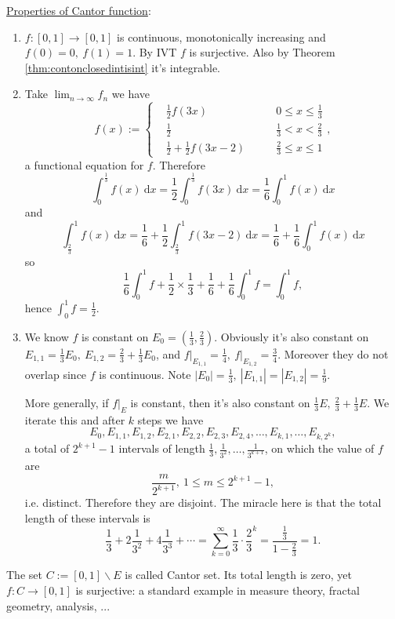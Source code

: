 \documentclass[a4paper]{article}
\theoremstyle{definition}
\begin{document}
\underline{Properties of Cantor function}:
\begin{enumerate}
    \item $f:[0,1]\rightarrow [0,1]$ is continuous, monotonically increasing and $f(0)=0,\ f(1)=1$. By IVT $f$ is surjective. Also by Theorem \ref{thm:contonclosedintisint} it's integrable.
    \item Take $\lim_{n\rightarrow \infty} f_n$ we have
    \[
    f(x) := \left\{\begin{aligned}&\frac12 f (3x) \qquad &0\leq x \leq \frac13 \\ &\frac12 \qquad &\frac13 <x < \frac23 \\ &\frac12 + \frac12 f(3x-2) \qquad &\frac23 \leq x \leq 1\end{aligned} \right. ,
    \]
    a functional equation for $f$. Therefore
    \[
    \int_0^\frac13 f(x) \ \mathrm d x = \frac12 \int_0^\frac13 f(3x) \ \mathrm d x = \frac16 \int_0^1 f(x) \ \mathrm d x
    \]
    and
    \[
    \int_\frac23^1 f(x) \ \mathrm d x = \frac16 + \frac12 \int_\frac23^1 f(3x-2) \ \mathrm d x = \frac16 +\frac16 \int_0^1 f(x) \ \mathrm d x
    \]
    so
    \[
    \frac16 \int_0^1 f + \frac12 \times \frac13+\frac16+\frac16\int_0^1 f=\int_0^1 f,
    \]
    hence $\int_0^1 f = \frac12$.
    \item We know $f$ is constant on $E_0=\left(\frac13,\frac23 \right).$ Obviously it's also constant on $E_{1,1}=\frac13 E_0,\ E_{1,2}=\frac23+\frac13 E_0$, and $\left.f\right|_{E_{1,1}}=\frac14,\ \left.f\right|_{E_{1,2}}=\frac34$. Moreover they do not overlap since $f$ is continuous. Note $|E_0|=\frac13,\ |E_{1,1}|=|E_{1,2}|=\frac19$.
    
    More generally, if $\left.f\right|_E$ is constant, then it's also constant on $\frac13 E,\ \frac23+\frac13 E$. We iterate this and after $k$ steps we have 
    \[
    E_0,E_{1,1},E_{1,2},E_{2,1},E_{2,2},E_{2,3},E_{2,4},\ldots,E_{k,1},\ldots,E_{k,2^k},
    \]
    a total of $2^{k+1}-1$ intervals of length $\frac13,\frac{1}{3^2},\ldots,\frac{1}{3^{k+1}}$, on which the value of $f$ are
    \[
    \frac{m}{2^{k+1}},\ 1\leq m\leq 2^{k+1}-1,
    \]
    i.e. distinct. Therefore they are disjoint. The miracle here is that the total length of these intervals is
    \[
    \frac13+2\frac{1}{3^2}+4\frac{1}{3^3}+\cdots =\sum_{k=0}^\infty \frac13\cdot \frac{2}{3}^k =\frac{\frac13}{1-\frac23} =1.
    \]
\end{enumerate}
The set $C:=[0,1]\backslash E$ is called Cantor set. Its total length is zero, yet $f:C\rightarrow [0,1]$ is surjective: a standard example in measure theory, fractal geometry, analysis, ...
\end{document}
